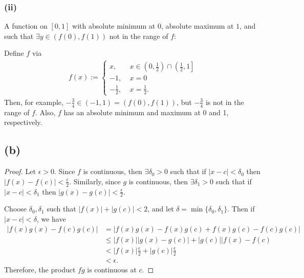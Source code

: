 \documentclass{article}
\begin{document}
\subsubsection*{(ii)}
A function on $[0, 1]$ with absolute minimum at $0$, absolute maximum at $1$, and such that $\exists y \in (f(0), f(1))$ not in the range of $f$:

Define $f$ via
\begin{align}
	f(x) := 
	\begin{cases}
		x, \quad &x \in \left(0, \frac{1}{2}\right) \cap \left(\frac{1}{2}, 1\right] \\
		-1, &x = 0 \\
		-\frac{1}{2}, &x = \frac{1}{2}.
	\end{cases}
\end{align}
Then, for example, $-\frac{3}{4} \in (-1, 1) = \left(f(0), f(1)\right)$, but $-\frac{3}{4}$ is not in the range of $f$. Also, $f$ has an absolute minimum and maximum at 0 and 1, respectively. 

\subsection*{(b)}
\begin{proof}
	Let $\epsilon > 0$. Since $f$ is continuous, then $\exists \delta_0 > 0$ such that if $|x - c| < \delta_0$ then $|f(x) - f(c)| < \frac{\epsilon}{2}$. Similarly, since $g$ is continuous, then $\exists \delta_1 > 0$ such that if $|x - c| < \delta_1$ then $|g(x) - g(c)| < \frac{\epsilon}{2}$. 
	
	Choose $\delta_0, \delta_1$ such that $|f(x)| + |g(c)| < 2$, and let $\delta = \min\{\delta_0, \delta_1\}$. Then if $|x - c| < \delta$, we have
	\begin{align}
		|f(x)g(x) - f(c)g(c)| &= |f(x)g(x) - f(x)g(c) + f(x)g(c) - f(c)g(c)| \\
		&\leq |f(x)||g(x) - g(c)| + |g(c)||f(x) - f(c) \\
		&< |f(x)|\frac{\epsilon}{2} + |g(c)|\frac{\epsilon}{2} \\
		&< \epsilon.
	\end{align} 
	Therefore, the product $fg$ is continuous at $c$. 
\end{proof}
\end{document}
